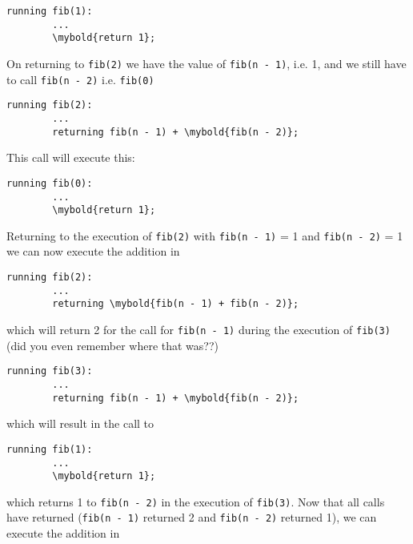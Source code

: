 \begin{Verbatim}[frame=single, commandchars=\\\{\}]
    running fib(1):
        ...
        \mybold{return 1};
\end{Verbatim}

On returning to \verb!fib(2)! we have the value of \verb!fib(n - 1)!, i.e. 1, and we still
have to call \verb!fib(n - 2)! i.e. \verb!fib(0)!

\begin{Verbatim}[frame=single, commandchars=\\\{\}]
    running fib(2):
        ...
        returning fib(n - 1) + \mybold{fib(n - 2)};
\end{Verbatim}

This call will execute this:

\begin{Verbatim}[frame=single, commandchars=\\\{\}]
    running fib(0):
        ...
        \mybold{return 1};
\end{Verbatim}



\newpage
Returning to the execution of \verb!fib(2)! with \verb!fib(n - 1)! = 1 and \verb!fib(n - 2)! = 1
we can now execute the addition in


\begin{Verbatim}[frame=single, commandchars=\\\{\}]
    running fib(2):
        ... 
        returning \mybold{fib(n - 1) + fib(n - 2)};
      \end{Verbatim}
      
which will return 2 for the call for \verb!fib(n - 1)! during the execution of \verb!fib(3)! (did
you even remember where that was??)

\begin{Verbatim}[frame=single, commandchars=\\\{\}]
     running fib(3):
        ...
        returning fib(n - 1) + \mybold{fib(n - 2)};
\end{Verbatim}

which will result in the call to

\begin{Verbatim}[frame=single, commandchars=\\\{\}]
    running fib(1):
        ...
        \mybold{return 1};
\end{Verbatim}

which returns 1 to \verb!fib(n - 2)! in the execution of \verb!fib(3)!. Now that all calls have
returned (\verb!fib(n - 1)! returned 2 and \verb!fib(n - 2)! returned 1), we can execute the addition in

